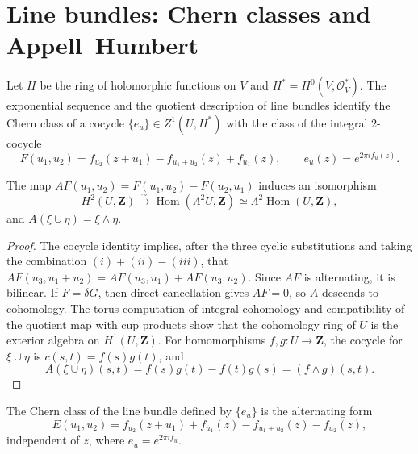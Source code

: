 
\section{Line bundles: Chern classes and Appell--Humbert}
\label{mumford-source-I2-remainder}

Let $H$ be the ring of holomorphic functions on $V$ and
$H^*=H^0(V,\mathcal O_V^*)$. The exponential sequence and the quotient
description of line bundles identify the Chern class of a cocycle
$\{e_u\}\in Z^1(U,H^*)$ with the class of the integral $2$-cocycle
\[
 F(u_1,u_2)=f_{u_2}(z+u_1)-f_{u_1+u_2}(z)+f_{u_1}(z),
 \qquad e_u(z)=e^{2\pi i f_u(z)}.
\]

\begin{lemma}
\label{mumford-source-alternation}
The map $AF(u_1,u_2)=F(u_1,u_2)-F(u_2,u_1)$ induces an isomorphism
\[
 H^2(U,\mathbf Z)\xrightarrow{\sim}\operatorname{Hom}(\Lambda^2U,\mathbf Z)
 \simeq\Lambda^2\operatorname{Hom}(U,\mathbf Z),
\]
and $A(\xi\cup\eta)=\xi\wedge\eta$.
\end{lemma}
\begin{proof}
The cocycle identity implies, after the three cyclic substitutions and taking
the combination $(i)+(ii)-(iii)$, that
$AF(u_3,u_1+u_2)=AF(u_3,u_1)+AF(u_3,u_2)$. Since $AF$ is alternating, it is
bilinear. If $F=\delta G$, then direct cancellation gives $AF=0$, so $A$
descends to cohomology. The torus computation of integral cohomology and
compatibility of the quotient map with cup products show that the cohomology
ring of $U$ is the exterior algebra on $H^1(U,\mathbf Z)$. For homomorphisms
$f,g:U\to\mathbf Z$, the cocycle for $\xi\cup\eta$ is
$c(s,t)=f(s)g(t)$, and
\[
 A(\xi\cup\eta)(s,t)=f(s)g(t)-f(t)g(s)=(f\wedge g)(s,t).
\]
\end{proof}

\begin{proposition}
\label{mumford-source-chern-formula}
The Chern class of the line bundle defined by $\{e_u\}$ is the alternating form
\[
 E(u_1,u_2)=f_{u_2}(z+u_1)+f_{u_1}(z)-f_{u_1+u_2}(z)-f_{u_2}(z),
\]
independent of $z$, where $e_u=e^{2\pi i f_u}$.
\end{proposition}

